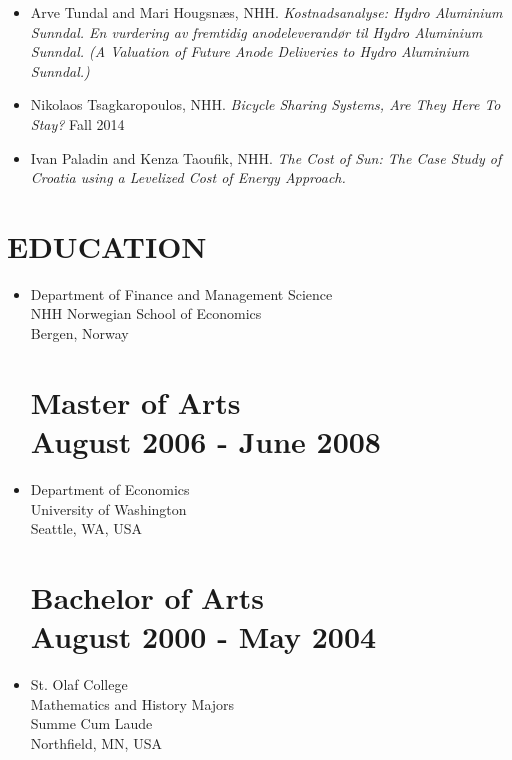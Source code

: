 \documentclass[margin]{res}
\begin{document}
\begin{resume}
\begin{itemize}
\begin{itemize}
  \item[] Arve Tundal and Mari Hougsn\ae s, NHH.  \emph{Kostnadsanalyse: Hydro Aluminium Sunndal.  En vurdering av fremtidig anodeleverand\o r til Hydro Aluminium Sunndal. (A Valuation of Future Anode Deliveries to Hydro Aluminium Sunndal.)} 
  \item[] Nikolaos Tsagkaropoulos, NHH. \emph{Bicycle Sharing Systems, Are They Here To Stay?} Fall 2014
  \item[] Ivan Paladin and Kenza Taoufik, NHH. \emph{The Cost of Sun: The Case Study of Croatia using a Levelized Cost of Energy Approach.}
  \end{itemize}
\end{itemize}

\section{EDUCATION}      
 
\begin{itemize}
\normalsize{\section{Ph.D. Business Economics \\ August 2008 - May 2012}} 
\item[] Department of Finance and Management Science\\
NHH Norwegian School of Economics \\
Bergen, Norway \\   

\normalsize{\section{\bf Master of Arts \\ August 2006 - June 2008}}
\item[] Department of Economics \\
University of Washington \\
Seattle, WA, USA \\

\normalsize{\section{\bf Bachelor of Arts \\ August 2000 - May 2004}}
\item[] St. Olaf College  \\
Mathematics and History Majors \\
Summe Cum Laude \\
Northfield, MN, USA \\
\end{itemize}


\end{resume}
\end{document}
